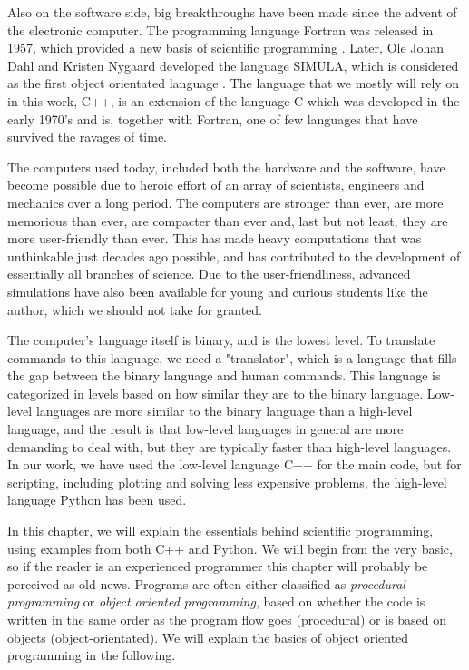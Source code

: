 Also on the software side, big breakthroughs have been made since the advent of the electronic computer. The programming language Fortran was released in 1957, which provided a new basis of scientific programming \cite{allen_history_1981}. Later, Ole Johan Dahl and Kristen Nygaard developed the language SIMULA, which is considered as the first object orientated language \cite{holmevik_compiling_1994}. The language that we mostly will rely on in this work, C++, is an extension of the language C which was developed in the early 1970's and is, together with Fortran, one of few languages that have survived the ravages of time. 

The computers used today, included both the hardware and the software, have become possible due to heroic effort of an array of scientists, engineers and mechanics over a long period. The computers are stronger than ever, are more memorious than ever, are compacter than ever and, last but not least, they are more user-friendly than ever. This has made heavy computations that was unthinkable just decades ago possible, and has contributed to the development of essentially all branches of science. Due to the user-friendliness, advanced simulations have also been available for young and curious students like the author, which we should not take for granted. 

The computer's language itself is binary, and is the lowest level. To translate commands to this language, we need a "translator", which is a language that fills the gap between the binary language and human commands. This language is categorized in levels based on how similar they are to the binary language. Low-level languages are more similar to the binary language than a high-level language, and the result is that low-level languages in general are more demanding to deal with, but they are typically faster than high-level languages. In our work, we have used the low-level language C++ for the main code, but for scripting, including plotting and solving less expensive problems, the high-level language Python has been used. 

In this chapter, we will explain the essentials behind scientific programming, using examples from both C++ and Python. We will begin from the very basic, so if the reader is an experienced programmer this chapter will probably be perceived as old news. Programs are often either classified as \textit{procedural programming} or \textit{object oriented programming}, based on whether the code is written in the same order as the program flow goes (procedural) or is based on objects (object-orientated). We will explain the basics of object oriented programming in the following.


